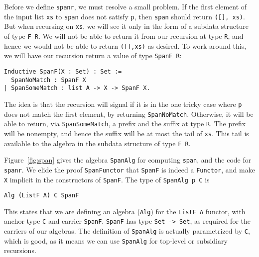 \documentclass[a4paper,USenglish]{lipics-v2021}
\begin{document}
Before we define \verb|spanr|, we must resolve a small problem.
If the first element of the input list
\verb|xs| to \verb|span| does not satisfy \verb|p|, then \verb|span|
should return \verb|([], xs)|.  But when recursing on \verb|xs|, we
will see it only in the form of a subdata structure of type
\verb|F R|.  We will not be able to return it from our recursion at
type \verb|R|, and hence we would not be able to return \verb|([],xs)|
as desired.  To work around this, we will have our recursion return a value
of type \verb|SpanF R|:
\begin{verbatim}
Inductive SpanF(X : Set) : Set :=
  SpanNoMatch : SpanF X
| SpanSomeMatch : list A -> X -> SpanF X.
\end{verbatim}
\noindent The idea is that the recursion will signal if it is in the
one tricky case where \verb|p| does not match the first element, by
returning \verb|SpanNoMatch|.  Otherwise, it will be able to return,
via \verb|SpanSomeMatch|, a prefix and the suffix at type
\verb|R|. The prefix will be nonempty, and hence the suffix will be at
most the tail of \verb|xs|.  This tail is available to the algebra
in the subdata structure of type \verb|F R|.

Figure~\ref{fig:span} gives the algebra \verb|SpanAlg| for computing
\verb|span|, and the code for \verb|spanr|.  We elide the proof
\verb|SpanFunctor| that \verb|SpanF| is indeed a \verb|Functor|,
and make \verb|X| implicit in the constructors of \verb|SpanF|.
The type of \verb|SpanAlg p C| is
\begin{verbatim}
Alg (ListF A) C SpanF
\end{verbatim}
This states that we are defining an algebra (\verb|Alg|) for the
\verb|ListF A| functor, with anchor type \verb|C| and carrier
\verb|SpanF|.  \verb|SpanF| has type \verb|Set -> Set|, as required
for the carriers of our algebras. The definition of \verb|SpanAlg| is
actually parametrized by \verb|C|, which is good, as it means we can
use \verb|SpanAlg| for top-level or subsidiary recursions.
\end{document}
